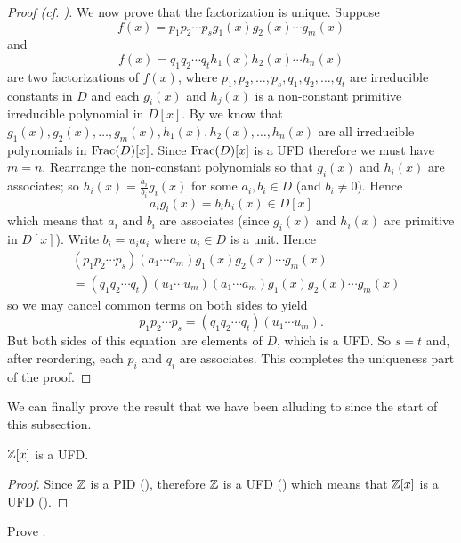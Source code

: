 \begin{proof}[Proof (cf. {\cite[Theorem 18.29]{judson_beezer_2022}})]
    We now prove that the factorization is unique. Suppose
    \[
        f(x) = p_1p_2\cdots p_s g_1(x)g_2(x) \cdots g_m(x)
    \]
    and
    \[
        f(x) = q_1q_2\cdots q_t h_1(x)h_2(x) \cdots h_n(x)
    \]
    are two factorizations of $f(x)$, where $p_1, p_2, \dots, p_s, q_1, q_2, \dots, q_t$ are irreducible constants in $D$ and each $g_i(x)$ and $h_j(x)$ is a non-constant primitive irreducible polynomial in $D[x]$. By  we know that $g_1(x), g_2(x), \dots, g_m(x), h_1(x), h_2(x), \dots, h_n(x)$ are all irreducible polynomials in $\mathrm{Frac}(D)[x]$. Since $\mathrm{Frac}(D)[x]$ is a UFD therefore we must have $m = n$. Rearrange the non-constant polynomials so that $g_i(x)$ and $h_i(x)$ are associates; so $h_i(x) = \frac{a_i}{b_i}g_i(x)$ for some $a_i, b_i \in D$ (and $b_i \neq 0$). Hence
    \[
        a_i g_i(x) = b_i h_i(x) \in D[x]
    \]
    which means that $a_i$ and $b_i$ are associates (since $g_i(x)$ and $h_i(x)$ are primitive in $D[x]$). Write $b_i = u_ia_i$ where $u_i \in D$ is a unit. Hence
    \begin{align*}
        &(p_1p_2\cdots p_s)(a_1\cdots a_m) g_1(x)g_2(x) \cdots g_m(x)\\
        &= (q_1q_2\cdots q_t)(u_1\cdots u_m)(a_1\cdots a_m)g_1(x)g_2(x) \cdots g_m(x)
    \end{align*}
    so we may cancel common terms on both sides to yield
    \[
        p_1p_2\cdots p_s = (q_1q_2\cdots q_t)(u_1\cdots u_m).
    \]
    But both sides of this equation are elements of $D$, which is a UFD. So $s = t$ and, after reordering, each $p_i$ and $q_i$ are associates. This completes the uniqueness part of the proof.
\end{proof}

We can finally prove the result that we have been alluding to since the start of this subsection.

\begin{corollary}\label{corollary-Z-is-UFD}
    $\mathbb{Z}[x]$ is a UFD.
\end{corollary}
\begin{proof}
    Since $\mathbb{Z}$ is a PID (), therefore $\mathbb{Z}$ is a UFD () which means that $\mathbb{Z}[x]$ is a UFD ().
\end{proof}

\begin{exercise}\label{exercise-primitive-polynomial-irreducible-iff-polynomial-irreducible-in-field-of-fractions}
    Prove .
\end{exercise}

